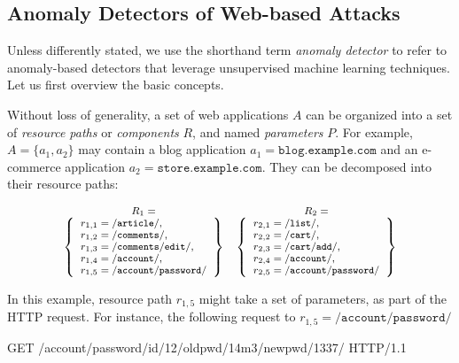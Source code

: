 \subsection{Anomaly Detectors of Web-based Attacks}
\label{web:intro:ad}
Unless differently stated, we use the shorthand term \emph{anomaly detector} to refer to anomaly-based detectors that leverage unsupervised machine learning techniques. Let us first overview the basic concepts.

Without loss of generality, a set of web applications $A$ can be organized into a set of \emph{resource paths} or \emph{components} $R$, and named \emph{parameters} $P$. For example, $A = \{a_{1}, a_{2}\}$ may contain a blog application $a_1=\mathtt{blog.example.com}$ and an e-commerce application $a_{2}=\mathtt{store.example.com}$. They can be decomposed into their resource paths:

\begin{displaymath}\footnotesize
  \begin{array}{cc}
    R_{1} = & R_{2} = \\
    \left\{
      \begin{array}{l}
        r_{1,1} = \mathtt{/article/},\\
        r_{1,2} = \mathtt{/comments/},\\
        r_{1,3} = \mathtt{/comments/edit/},\\
        r_{1,4} = \mathtt{/account/},\\
        r_{1,5} = \mathtt{/account/password/}
      \end{array}
    \right\}
    &
    \left\{
      \begin{array}{l}
        r_{2,1} = \mathtt{/list/},\\
        r_{2,2} = \mathtt{/cart/},\\
        r_{2,3} = \mathtt{/cart/add/},\\
        r_{2,4} = \mathtt{/account/},\\
        r_{2,5} = \mathtt{/account/password/}
      \end{array}
    \right\}
  \end{array}
\end{displaymath}

\noindent In this example, resource path $r_{1,5}$ might take a set of parameters, as part of the \ac{HTTP} request. For instance, the following request to $r_{1,5} = \mathtt{/account/password/}$

\begin{logs}
  GET /account/password/id/12/oldpwd/14m3/newpwd/1337/ HTTP/1.1
\end{logs}


